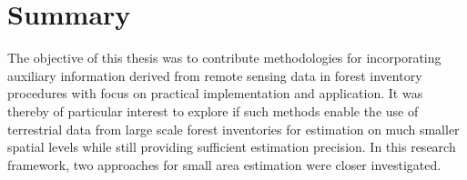 \chapter*{Summary}
\label{chap:Summary}

The objective of this thesis was to contribute methodologies for incorporating auxiliary information derived from remote sensing data in forest inventory procedures with focus on practical implementation and application. It was thereby of particular interest to explore if such methods enable the use of terrestrial data from large scale forest inventories for estimation on much smaller spatial levels while still providing sufficient estimation precision. In this research framework, two approaches for small area estimation were closer investigated.\par

